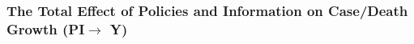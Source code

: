 \documentclass{beamer}
\renewcommand{\to}{{\rightarrow}}
\begin{document}
\begin{frame}
  \frametitle{The Total Effect of Policies and Information on Case/Death Growth (PI$\to$ Y)}


\begin{table}[!htbp] \centering
 \begin{minipage}{\linewidth}
   \centering
   \resizebox*{!}{\dimexpr\textheight-2\baselineskip\relax}{
   \centering
   \footnotesize
   \begin{tabular}{cc}
   \begin{minipage}{\linewidth}
     \centering
     
   \end{minipage}
     &
   \begin{minipage}{\linewidth}
     \centering
     
   \end{minipage}

   \end{tabular}
   }
 \end{minipage}
\end{table}

\end{frame}


\end{document}
